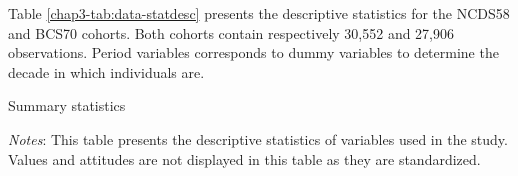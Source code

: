 Table \ref{chap3-tab:data-statdesc} presents the descriptive statistics for the NCDS58 and BCS70 cohorts. Both cohorts contain respectively 30,552 and 27,906 observations. Period variables corresponds to dummy variables to determine the decade in which individuals are.
\begin{table}[!tb]
    \centering
    \caption{Summary statistics}
    \label{chap3-tab:data-statdesc}
    \begin{threeparttable}
        \setlength{\tabcolsep}{5pt}
        
        \begin{tablenotes}[flushleft]
            \footnotesize{\item \textit{Notes}: This table presents the descriptive statistics of variables used in the study. Values and attitudes are not displayed in this table as they are standardized.}
        \end{tablenotes}
    \end{threeparttable}
\end{table}
